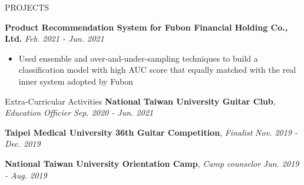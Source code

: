 \documentclass{resume} %
\begin{document}
\begin{rSection}{PROJECTS}
\item \textbf{Product Recommendation System for Fubon Financial Holding Co., Ltd.} \hfill \textit{Feb. 2021 - Jun. 2021}
\begin{itemize}
    \itemsep -3pt
    \item Used ensemble and over-and-under-sampling techniques to build a classification model with high AUC score that equally matched with the real inner system adopted by Fubon
\end{itemize}




\end{rSection} 

\begin{rSection}{Extra-Curricular Activities} 
\textbf{National Taiwan University Guitar Club}, \textit{Education Officier} \hfill \textit{Sep. 2020 - Jun. 2021}

\textbf{Taipei Medical University 36th Guitar Competition}, \textit{Finalist}  \hfill \textit{Nov. 2019 - Dec. 2019} 


\textbf{National Taiwan University Orientation Camp}, \textit{Camp counselor}  \hfill \textit{Jun. 2019 - Aug. 2019} 



\end{rSection}

\end{document}
